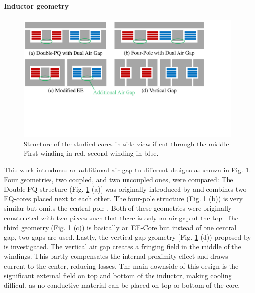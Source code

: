 \documentclass{IPEC2026}
\begin{document}
\paragraph{Inductor geometry}
\begin{figure}
  \includegraphics[page=1, trim = 0cm 6.8cm 4.5cm 0cm, clip, width=\columnwidth]{figures/IPEC_Figures_PowerPoint.pdf}
  \caption{Structure of the studied cores in side-view if cut through the middle. First winding in red, second winding in blue.}
  \label{fig:Core_Drawings}
\end{figure}
This work introduces an additional air-gap to different designs as shown in Fig. \ref{fig:Core_Drawings}. Four geometries, two coupled, and two uncoupled ones, were compared: The Double-PQ structure (Fig. \ref{fig:Core_Drawings} (a)) was originally introduced by \cite{wangPCBWindingBasedCoupled2023} and combines two EQ-cores placed next to each other. The four-pole structure (Fig. \ref{fig:Core_Drawings} (b)) is very similar but omits the central pole \cite{huaUltrathinCoupledInductor2021}. Both of these geometries were originally constructed with two pieces such that there is only an air gap at the top.
The third geometry (Fig. \ref{fig:Core_Drawings} (c)) is basically an EE-Core but instead of one central gap, two gaps are used. Lastly, the vertical gap geometry (Fig. \ref{fig:Core_Drawings} (d)) proposed by \cite{schaferNovelHighlyEfficient2020} is investigated. The vertical air gap creates a fringing field in the middle of the windings. This partly compensates the internal proximity effect and draws current to the center, reducing losses. The main downside of this design is the significant external field on top and bottom of the inductor, making cooling difficult as no conductive material can be placed on top or bottom of the core. %
\end{document}
